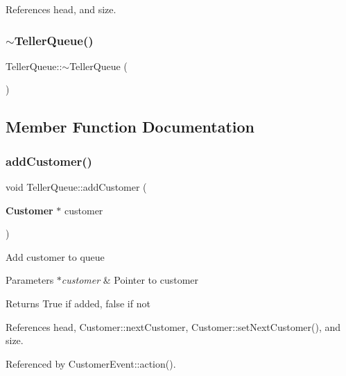 References head, and size.

\mbox{\label{classTellerQueue_a6370bd57b6ecf0b8e206afb741d847a9}} 
\subsubsection{$\sim$\+Teller\+Queue()}
{\footnotesize\ttfamily Teller\+Queue\+::$\sim$\+Teller\+Queue (\begin{DoxyParamCaption}{ }\end{DoxyParamCaption})\hspace{0.3cm}{\ttfamily [virtual]}}



\subsection{Member Function Documentation}
\mbox{\label{classTellerQueue_af4486f1ad34b547085f03bc12dbbe66d}} 
\subsubsection{add\+Customer()}
{\footnotesize\ttfamily void Teller\+Queue\+::add\+Customer (\begin{DoxyParamCaption}\item[{\textbf{ Customer} $\ast$}]{customer }\end{DoxyParamCaption})}

Add customer to queue 
\begin{DoxyParams}{Parameters}
{\em $\ast$customer} & Pointer to customer \\
\hline
\end{DoxyParams}
\begin{DoxyReturn}{Returns}
True if added, false if not 
\end{DoxyReturn}


References head, Customer\+::next\+Customer, Customer\+::set\+Next\+Customer(), and size.



Referenced by Customer\+Event\+::action().

\mbox{\label{classTellerQueue_aeb00c26036f427f1229af3a97da53553}} 
